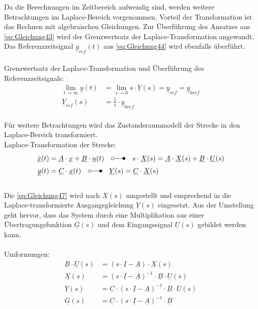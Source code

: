 \documentclass[
	pagesize,
	fontsize=12pt,
	paper=a4,
	oneside,
   reqno
]{scrartcl}
\begin{document}
Da die Berechnungen im Zeitbereich aufwendig sind, werden weitere Betrachtungen im Laplace-Bereich vorgenommen. Vorteil der Transformation ist das Rechnen mit algebraischen Gleichungen. Zur Überführung des Ansatzes aus \autoref{eq:Gleichung43} wird der Grenzwertsatz der Laplace-Transformation angewandt. Das Referenzzeitsignal $\underline{y}_{ref}(t)$ aus \autoref{eq:Gleichung44} wird ebenfalls überführt.\\\\
Grenzwertsatz der Laplace-Transformation und Überführung des Referenzzeitsignals:
\begin{align}
    \lim_{t \to \infty} \underline{y}(t) &= \lim_{s \to 0} s\cdot\underline{Y}(s) = \underline{y}_{ref} = \underline{y}_{0ref} \label{eq:Gleichung45}\\
    \underline{Y}_{ref}(s) &= \frac{1}{s}\cdot\underline{y}_{0ref} \label{eq:Gleichung46}
\end{align}\\
Für weitere Betrachtungen wird das Zustandsraummodell der Strecke in den Laplace-Bereich transformiert.\\
Laplace-Transformation der Strecke:
\begin{align}
    \underline{\dot{x}}(t) &= \underline{A}\cdot\underline{x}+\underline{B}\cdot\underline{u}(t)\quad\laplace\quad s\cdot \underline{X}(s) = \underline{A}\cdot\underline{X}(s)+\underline{B}\cdot\underline{U}(s) \label{eq:Gleichung47}\\
    \underline{y}(t) &= \underline{C}\cdot\underline{x}(t) \quad\laplace\quad \underline{Y}(s) = \underline{C}\cdot\underline{X}(s) \label{eq:Gleichung48}
\end{align}\\
Die \autoref{eq:Gleichung47} wird nach $\underline{X}(s)$ umgestellt und ensprechend in die Laplace-transformierte Ausgangsgleichung $\underline{Y}(s)$ eingesetzt. Aus der Umstellung geht hervor, dass das System durch eine Multiplikation aus einer Übertragungsfunktion $\underline{G}(s)$ und dem Eingangssignal $\underline{U}(s)$ gebildet werden kann.\\\\
Umformungen:
\begin{align}
    \underline{B}\cdot\underline{U}(s) &= (s\cdot\underline{I}-\underline{A})\cdot\underline{X}(s) \label{eq:Gleichung49}\\
    \underline{X}(s) &= (s\cdot\underline{I}-\underline{A})^{-1}\cdot\underline{B}\cdot\underline{U}(s) \nonumber \\
    \underline{Y}(s) &= \underline{C}\cdot(s\cdot\underline{I}-\underline{A})^{-1}\cdot\underline{B}\cdot\underline{U}(s) \label{eq:Gleichung50}\\
    \underline{G}(s) &= \underline{C}\cdot(s\cdot\underline{I}-\underline{A})^{-1}\cdot\underline{B} \nonumber
\end{align}\\
\end{document}
